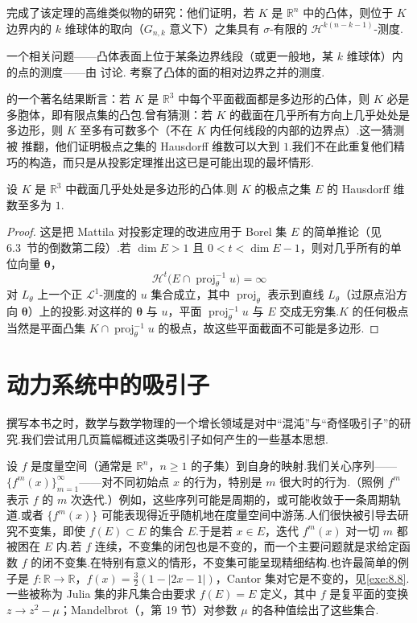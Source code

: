 \textcite{ewaldlarmanrogers1970} 完成了该定理的高维类似物的研究：他们证明，若 $K$ 是 $\mathbb{R}^n$ 中的凸体，则位于 $K$ 边界内的 $k$ 维球体的取向（$G_{n,k}$ 意义下）之集具有 $\sigma$-有限的 $\mathcal{H}^{k(n-k-1)}$-测度.

一个相关问题——凸体表面上位于某条边界线段（或更一般地，某 $k$ 维球体）内的点的测度——由 \textcite{burton1979} 讨论.\textcite{larman1971b} 考察了凸体的面的相对边界之并的测度.

\textcite{klee1959} 的一个著名结果断言：若 $K$ 是 $\mathbb{R}^3$ 中每个平面截面都是多边形的凸体，则 $K$ 必是多胞体，即有限点集的凸包.曾有猜测：若 $K$ 的截面在几乎所有方向上几乎处处是多边形，则 $K$ 至多有可数多个（不在 $K$ 内任何线段的内部的边界点）.这一猜测被 \textcite{dallalarman1980} 推翻，他们证明极点之集的 Hausdorff 维数可以大到 $1$.我们不在此重复他们精巧的构造，而只是从投影定理推出这已是可能出现的最坏情形.

\begin{theorem}\label{thm:8.20}
设 $K$ 是 $\mathbb{R}^3$ 中截面几乎处处是多边形的凸体.则 $K$ 的极点之集 $E$ 的 Hausdorff 维数至多为 $1$.
\end{theorem}

\begin{proof}
这是把 Mattila 对投影定理的改进应用于 Borel 集 $E$ 的简单推论（见 6.3~节的倒数第二段）.若 $\dim E>1$ 且 $0<t<\dim E-1$，则对几乎所有的单位向量 $\boldsymbol{\theta}$，
\[
  \mathcal{H}^{t}\bigl(E\cap\operatorname{proj}_{\theta}^{-1}u\bigr)=\infty
\]
对 $L_\theta$ 上一个正 $\mathscr{L}^1$-测度的 $u$ 集合成立，其中 $\operatorname{proj}_{\theta}$ 表示到直线 $L_\theta$（过原点沿方向 $\boldsymbol{\theta}$）上的投影.对这样的 $\boldsymbol{\theta}$ 与 $u$，平面 $\operatorname{proj}_{\theta}^{-1}u$ 与 $E$ 交成无穷集.$K$ 的任何极点当然是平面凸集 $K\cap\operatorname{proj}_{\theta}^{-1}u$ 的极点，故这些平面截面不可能是多边形.
\end{proof}

\section{动力系统中的吸引子}

撰写本书之时，数学与数学物理的一个增长领域是对中``混沌''与``奇怪吸引子''的研究.我们尝试用几页篇幅概述这类吸引子如何产生的一些基本思想.

设 $f$ 是度量空间（通常是 $\mathbb{R}^n$，$n\geq 1$ 的子集）到自身的映射.我们关心序列—— $\{f^m(x)\}_{m=1}^{\infty}$——对不同初始点 $x$ 的行为，特别是 $m$ 很大时的行为.（照例 $f^m$ 表示 $f$ 的 $m$ 次迭代.）例如，这些序列可能是周期的，或可能收敛于一条周期轨道.或者 $\{f^m(x)\}$ 可能表现得近乎随机地在度量空间中游荡.人们很快被引导去研究不变集，即使 $f(E)\subset E$ 的集合 $E$.于是若 $x\in E$，迭代 $f^m(x)$ 对一切 $m$ 都被困在 $E$ 内.若 $f$ 连续，不变集的闭包也是不变的，而一个主要问题就是求给定函数 $f$ 的闭不变集.在特别有意义的情形，不变集可能呈现精细结构.也许最简单的例子是 $f:\mathbb{R}\to\mathbb{R}$，$f(x)=\frac{3}{2}(1-|2x-1|)$，Cantor 集对它是不变的，见\cref{exe:8.8}.一些被称为 Julia 集的非凡集合由要求 $f(E)=E$ 定义，其中 $f$ 是复平面的变换 $z\to z^2-\mu$；Mandelbrot（\citeyear{mandelbrot1982}，第 19 节）对参数 $\mu$ 的各种值绘出了这些集合.

